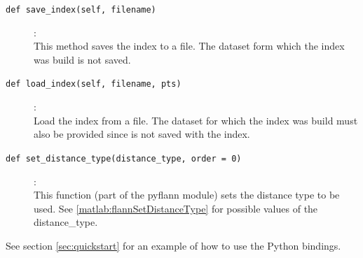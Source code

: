 \documentclass[letter,10pt]{article}
\begin{document}
\begin{description}
\item [\texttt{def save\_index(self, filename)}] :\\
    This method saves the index to a file. The dataset form which the index was
build is not saved.

\item [\texttt{def load\_index(self, filename, pts)}] :\\
    Load the index from a file. The dataset for which the index was build must also 
be provided since is not saved with the index.

\item [\texttt{def set\_distance\_type(distance\_type, order = 0)}] :\\
    This function (part of the pyflann module) sets the distance type to be used. See
\ref{matlab:flannSetDistanceType} for possible values of the distance\_type.

\end{description}



See section \ref{sec:quickstart} for an example of how to use the Python
bindings.




\end{document}

